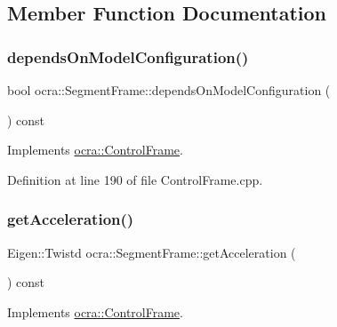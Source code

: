 \subsection{Member Function Documentation}
\hypertarget{classocra_1_1SegmentFrame_a68708b5ced24d192fbb0bfd9e3647925}{}\label{classocra_1_1SegmentFrame_a68708b5ced24d192fbb0bfd9e3647925} 
\subsubsection{\texorpdfstring{depends\+On\+Model\+Configuration()}{dependsOnModelConfiguration()}}
{\footnotesize\ttfamily bool ocra\+::\+Segment\+Frame\+::depends\+On\+Model\+Configuration (\begin{DoxyParamCaption}{ }\end{DoxyParamCaption}) const\hspace{0.3cm}{\ttfamily [virtual]}}



Implements \hyperlink{classocra_1_1ControlFrame_a65833d1f3f42bc8d452f8b1fb671e142}{ocra\+::\+Control\+Frame}.



Definition at line 190 of file Control\+Frame.\+cpp.

\hypertarget{classocra_1_1SegmentFrame_aa8f7f9544b59da591d94ac8e6a8a9e5d}{}\label{classocra_1_1SegmentFrame_aa8f7f9544b59da591d94ac8e6a8a9e5d} 
\subsubsection{\texorpdfstring{get\+Acceleration()}{getAcceleration()}}
{\footnotesize\ttfamily Eigen\+::\+Twistd ocra\+::\+Segment\+Frame\+::get\+Acceleration (\begin{DoxyParamCaption}{ }\end{DoxyParamCaption}) const\hspace{0.3cm}{\ttfamily [virtual]}}



Implements \hyperlink{classocra_1_1ControlFrame_a0ceb7cd7c3fe90fa0ef311b96a6f5c88}{ocra\+::\+Control\+Frame}.



